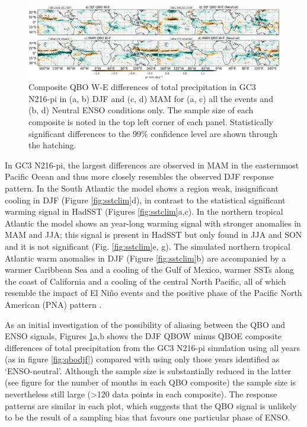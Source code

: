 \begin{figure}[t!]
\centering
 \includegraphics[width=\linewidth]{figures/qbonnpr.png}
\caption[Precipitation response to QBO W-E for GC3 N216-pi under different QBO phases.]{  Composite QBO W-E differences of total precipitation in GC3 N216-pi in (a, b) DJF and (c, d) MAM for (a, c) all the events and (b, d) Neutral ENSO conditions only. The sample size of each composite is noted in the top left corner of each panel. Statistically significant differences to the 99\% confidence level are shown through the hatching. }
\label{fig:qbonn}
\end{figure}

In GC3 N216-pi, the largest differences are observed in MAM in the easternmost Pacific Ocean and thus more closely resembles the observed DJF response pattern. In the South Atlantic the model shows a region weak, insignificant cooling in DJF (Figure \ref{fig:sstclim}d), in contrast to the statistical significant warming signal in HadSST (Figures \ref{fig:sstclim}a,c). In the northern tropical Atlantic the model shows an year-long warming signal with stronger anomalies in MAM and JJA; this signal is present in HadSST but only found in JJA and SON and it is not significant (Fig. \ref{fig:sstclim}e, g). The simulated northern tropical Atlantic warm anomalies in DJF (Figure \ref{fig:sstclim}b) are accompanied by a warmer Caribbean Sea and a cooling of the Gulf of Mexico, warmer SSTs along the coast of California and a cooling of the central North Pacific, all of which resemble the impact of El Niño events and the positive phase of the Pacific North American (PNA) pattern \citep{deser2010sea,guo2017distinct,jimenezesteve2020}.  

As an initial investigation of the possibility of aliasing between the QBO and ENSO signals, Figures \ref{fig:qbonn}a,b shows the DJF QBOW minus QBOE composite differences of total precipitation from the GC3 N216-pi simulation using all years (as in figure \ref{fig:qbodjf}) compared with using only those years identified as ‘ENSO-neutral’. Although the sample size is substantially reduced in the latter (see figure for the number of months in each QBO composite) the sample size is nevertheless still large (>120 data points in each composite). The response patterns are similar in each plot, which suggests that the QBO signal is unlikely to be the result of a sampling bias that favours one particular phase of ENSO.  


